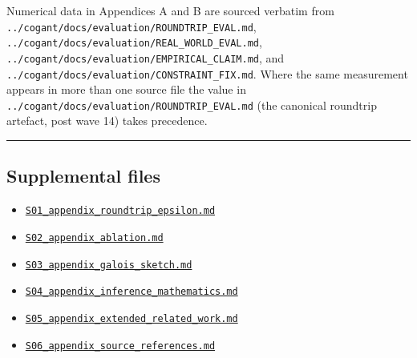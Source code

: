 \documentclass[
]{article}
\providecommand{\tightlist}{%
  \setlength{\itemsep}{0pt}\setlength{\parskip}{0pt}}
\begin{document}
Numerical data in Appendices A and B are sourced verbatim from
\texttt{../cogant/docs/evaluation/ROUNDTRIP\_EVAL.md},
\texttt{../cogant/docs/evaluation/REAL\_WORLD\_EVAL.md},
\texttt{../cogant/docs/evaluation/EMPIRICAL\_CLAIM.md}, and
\texttt{../cogant/docs/evaluation/CONSTRAINT\_FIX.md}. Where the same
measurement appears in more than one source file the value in
\texttt{../cogant/docs/evaluation/ROUNDTRIP\_EVAL.md} (the canonical
roundtrip artefact, post wave 14) takes precedence.

\begin{center}\rule{0.5\linewidth}{0.5pt}\end{center}

\subsection{Supplemental files}\label{supplemental-files}

\begin{itemize}
\tightlist
\item
  \href{S01_appendix_roundtrip_epsilon.md}{\texttt{S01\_appendix\_roundtrip\_epsilon.md}}
\item
  \href{S02_appendix_ablation.md}{\texttt{S02\_appendix\_ablation.md}}
\item
  \href{S03_appendix_galois_sketch.md}{\texttt{S03\_appendix\_galois\_sketch.md}}
\item
  \href{S04_appendix_inference_mathematics.md}{\texttt{S04\_appendix\_inference\_mathematics.md}}
\item
  \href{S05_appendix_extended_related_work.md}{\texttt{S05\_appendix\_extended\_related\_work.md}}
\item
  \href{S06_appendix_source_references.md}{\texttt{S06\_appendix\_source\_references.md}}
\end{itemize}



\clearpage


\end{document}
